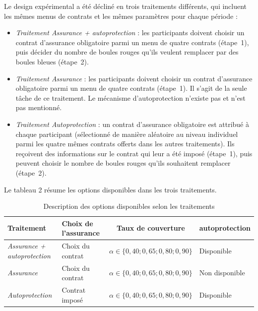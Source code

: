 \begin{Article}
\begin{refsection}[Mouminoux]
Le design expérimental a été décliné en trois traitements différents, qui incluent les mêmes menus de contrats et les mêmes paramètres pour chaque période :

\begin{itemize}
    \item \textit{Traitement Assurance + autoprotection} : les participants doivent choisir un contrat d'assurance obligatoire parmi un menu de quatre contrats (étape~1), puis décider du nombre de boules rouges qu'ils veulent remplacer par des boules bleues (étape~2).

    \item \textit{Traitement Assurance} : les participants doivent choisir un contrat d'assurance obligatoire parmi un menu de quatre contrats (étape~1). Il s'agit de la seule tâche de ce traitement. Le mécanisme d'autoprotection n'existe pas et n'est pas mentionné.

    \item \textit{Traitement Autoprotection} : un contrat d'assurance obligatoire est attribué à chaque participant (sélectionné de manière aléatoire au niveau individuel parmi les quatre mêmes contrats offerts dans les autres traitements). Ils reçoivent des informations sur le contrat qui leur a été imposé (étape~1), puis peuvent choisir le nombre de boules rouges qu'ils souhaitent remplacer (étape~2). \\

\end{itemize}

Le tableau 2 résume les options disponibles dans les trois traitements.


{\tabletextsize
\begin{longtable}[c]{L{2cm}L{2cm}cL{2cm}}
  \caption{Description des options disponibles selon les traitements}
  \label{tab:treatment_option} \\
  \toprule
         Traitement & Choix de l'assurance & Taux de couverture & autoprotection \\
  \midrule
  \textit{Assurance + autoprotection} & Choix du contrat  &  $\alpha \in \{0,40;0,65;0,80;0,90\}$ & Disponible \\
  \textit{Assurance} & Choix du contrat &  $\alpha \in \{0,40;0,65;0,80;0,90\}$ & Non disponible \\
  \textit{Autoprotection} & Contrat imposé &  $\alpha \in \{0,40;0,65;0,80;0,90\}$ & Disponible \\
  \bottomrule
  \end{longtable}}


\end{refsection}
\end{Article}
